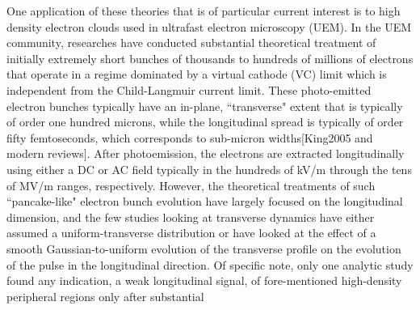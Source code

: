 \documentclass[aps,prl,twocolumn,showpacs,superscriptaddress,groupedaddress]{revtex4-1}  %
\begin{document}
One application of these theories that is of particular current interest is to 
high density electron clouds used in ultrafast electron microscopy (UEM).  
In the UEM community, researches have conducted substantial theoretical treatment of initially 
extremely short bunches of thousands to hundreds of millions of electrons that operate in a regime dominated
by a virtual cathode (VC) limit which is independent from
the Child-Langmuir current limit\cite{Luiten:2004_uniform_ellipsoidal,Valfells:2002_vc_limit,King:2005_review,Miller:2014_science_review,Tao:2012_space_charge}.  These photo-emitted electron bunches
typically have an in-plane, ``transverse" extent 
that is typically of order one hundred microns, while the  longitudinal 
spread is typically of order fifty femtoseconds, which corresponds to sub-micron widths[King2005 and modern reviews].  
After photoemission, 
the electrons are extracted longitudinally using either a DC 
or AC field typically in the hundreds of kV/m\cite{Tao:2012_space_charge,Portman:2013_computational_characterization,van_Oudheusden:2007_rf_compression_theory,Sciaini:2011_review} through the tens of MV/m \cite{Li:2014_single_shot,Musumeci:2010_single_shot} ranges, respectively.   However, the theoretical 
treatments of such ``pancake-like" electron 
bunch evolution have largely focused on the longitudinal dimension\cite{Luiten:2004_uniform_ellipsoidal,Siwick:2002_mean_field,Qian:2002_fluid_flow,Reed:2006_short_pulse_theory,Collin:2005_broadening}, 
and the few studies looking at transverse dynamics have either assumed a uniform-transverse
distribution \cite{Collin:2005_broadening} or have looked at the effect of a smooth Gaussian-to-uniform evolution of the transverse profile
on the evolution of the pulse in the longitudinal direction\cite{Reed:2006_short_pulse_theory}.  
Of specific note, only one analytic study found any indication, a weak longitudinal signal,
of fore-mentioned high-density peripheral regions\cite{Reed:2006_short_pulse_theory} only after substantial
\end{document}
